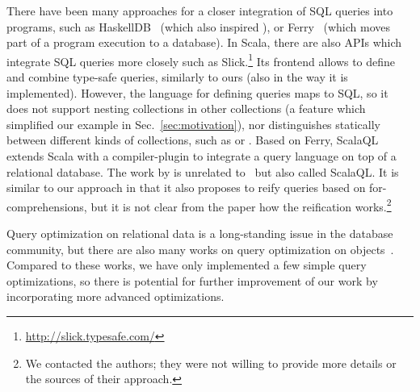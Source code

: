 There have been many approaches for a closer integration of SQL queries into programs, such as
HaskellDB~\citep{Leijen99DSEC} (which also inspired \LINQ), or Ferry~\citep{Grust:2009:FDP:1559845.1559982} 
(which moves part of a program execution to a database). In Scala, there are also
APIs which integrate SQL queries more closely such as
Slick.\footnote{\url{http://slick.typesafe.com/}} Its frontend allows to define
and combine type-safe queries, similarly to ours (also in the way it is
implemented).
However, the language for defining queries maps to SQL, so it does not support nesting collections
in other collections (a feature which simplified our example in
Sec.~\ref{sec:motivation}), nor distinguishes statically between different kinds of
collections, such as  or .
Based on Ferry, ScalaQL~\citep{JOT:issue_2010_07/article3} extends Scala with a compiler-plugin to integrate a query language on top of a relational database. The work by \citet{Spiewak09scalaql:language-integrated} is
 unrelated to~\citep{JOT:issue_2010_07/article3} but also called ScalaQL\@. It is similar to our approach in that it also 
proposes to reify queries based on for-comprehensions, but it is not clear from the paper how the reification 
works.\footnote{We contacted the authors; they were not willing to provide more details or the sources of their approach.}


Query optimization on relational data is a long-standing issue in the database community, but there
are also many works on query optimization on objects~\citep{Fegaras00,Grust99PhD}.
Compared to these works, we have only implemented a few simple query optimizations, so there is potential
for further improvement of our work by incorporating more advanced optimizations.




